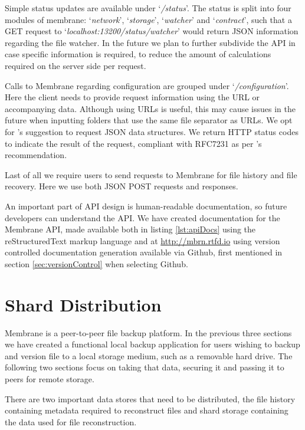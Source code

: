 \documentclass[11pt, a4paper, twoside]{report}
\begin{document}
Simple status updates are available under `\emph{/status}'. The status is split into four modules of membrane: `\emph{network}', `\emph{storage}', `\emph{watcher}' and `\emph{contract}', such that a GET request to `\emph{localhost:13200/status/watcher}' would return JSON information regarding the file watcher. In the future we plan to further subdivide the API in case specific information is required, to reduce the amount of calculations required on the server side per request.

Calls to Membrane regarding configuration are grouped under `\emph{/configuration}'. Here the client needs to provide request information using the URL or accompanying data. Although using URLs is useful, this may cause issues in the future when inputting folders that use the same file separator as URLs. We opt for \cite{heroku2017api}'s suggestion to request JSON data structures. We return HTTP status codes to indicate the result of the request, compliant with RFC7231 \citep{fielding2014hypertext} as per \cite{google2017api}'s recommendation.

Last of all we require users to send requests to Membrane for file history and file recovery. Here we use both JSON POST requests and responses.

An important part of API design is human-readable documentation, so future developers can understand the API. \citep{heroku2017api} We have created documentation for the Membrane API, made available both in listing \ref{lst:apiDocs} using the reStructuredText markup language and at \url{http://mbrn.rtfd.io} using version controlled documentation generation available via Github, first mentioned in section \ref{sec:versionControl} when selecting Github.

\section{Shard Distribution}

Membrane is a peer-to-peer file backup platform. In the previous three sections we have created a functional local backup application for users wishing to backup and version file to a local storage medium, such as a removable hard drive. The following two sections focus on taking that data, securing it and passing it to peers for remote storage.

There are two important data stores that need to be distributed, the file history containing metadata required to reconstruct files and shard storage containing the data used for file reconstruction.
\end{document}
